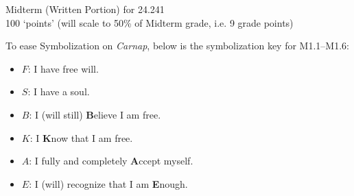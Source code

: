 \documentclass[12pt]{article}
\begin{document}

%
\newcommand{\detritus}[1]{}


\thispagestyle{empty}



\iffalse
\parindent = 0pt
\hspace*{0.0in}\parbox[t]{2.5in}{
Philosophy 24.241\\[3pt]
Symbolic Logic\\[3pt]
Fall, 2022
}
\fi 


\iffalse 
\begin{center}
\Large\bf Problem Set 5\\[1ex] 
 Due Fri. {\bf{October 14th}} by 5pm Eastern\\[3ex]
\end{center}
\fi

\begin{center}
\large Midterm (Written Portion) for 24.241 \\[1ex] 
\normalsize 100 `points' (will scale to 50\% of Midterm grade, i.e. 9 grade points)
\end{center}



To ease Symbolization on \textit{Carnap}, below is the symbolization key for M1.1--M1.6: 

\begin{itemize}
\item $F$: I have free will.
\item $S$: I have a soul. 
\item $B$: I (will still) \textbf{B}elieve I am free. 
\item $K$: I \textbf{K}now that I am free.
\item $A$: I fully and completely \textbf{A}ccept myself.
\item $E$: I (will) recognize that I am \textbf{E}nough.
\end{itemize}
\end{document}
